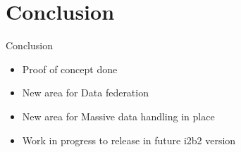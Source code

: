 \documentclass[10pt]{beamer}
\begin{document}
\section{Conclusion}
\begin{frame}{Conclusion}{}
\begin{itemize}
\item Proof of concept done
\item New area for Data federation
\item New area for Massive data handling in place
\item Work in progress to release in future i2b2 version
\end{itemize}
\end{frame}

{\1
\begin{frame}
\end{frame}}
\end{document}

